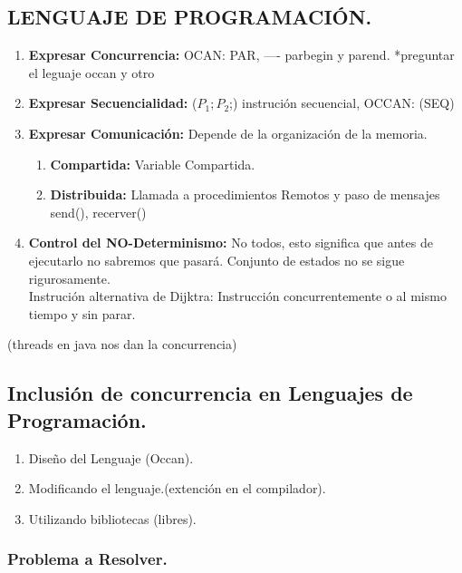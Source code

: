 \documentclass[12pt]{article}
\begin{document}
{\color{blue} \subsection*{\textbf{LENGUAJE DE PROGRAMACIÓN.}}}
\vspace{1em}

\begin{enumerate}
    \item \textbf{Expresar Concurrencia:} OCAN: PAR, ---- parbegin y parend. {\color{red}*preguntar el leguaje occan y otro}
    \item \textbf{Expresar Secuencialidad:} ($P_{1}; P_{2}$;) instrución secuencial, OCCAN: (SEQ)
    \item \textbf{Expresar Comunicación:} Depende de la organización de la memoria.
    \begin{enumerate}
        \item \textbf{Compartida:} Variable Compartida.
        \item \textbf{Distribuida:} Llamada a procedimientos Remotos y paso de mensajes \color{red} send(), recerver()
    \end{enumerate}
    \item \textbf{Control del NO-Determinismo:} No todos, esto significa que antes de ejecutarlo no sabremos que pasará. Conjunto de 
    estados no se sigue rigurosamente.\\
    Instrución alternativa de Dijktra: Instrucción concurrentemente o al mismo tiempo y sin parar.
\end{enumerate}

(threads en java nos dan la concurrencia)

{\color{blue} \subsection*{\textbf{Inclusión de concurrencia en Lenguajes de Programación.}}}
\begin{enumerate}
    \item Diseño del Lenguaje (Occan).
    \item Modificando el lenguaje.(extención en el compilador).
    \item Utilizando bibliotecas (libres).
\end{enumerate}
\vspace{2em}

{\color{blue} \subsubsection*{\textbf{Problema a Resolver.}}}
\end{document}
